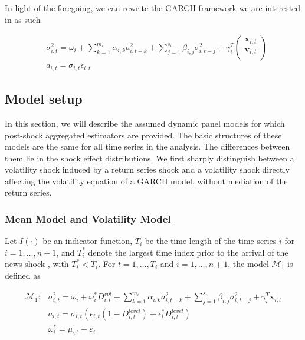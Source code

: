 \documentclass[11pt]{article}
\newcommand{\x}{\textbf{x}}
\def\mc#1{\mathcal{#1}} %
\def\mc#1{\mathcal{#1}}
\theoremstyle{definition}
\begin{document}
In light of the foregoing, we can rewrite the GARCH framework we are interested in as such

\begin{align*}
&\sigma_{i,t}^{2} = \omega_{i} + \sum^{m_{i}}_{k=1}\alpha_{i,k}a^{2}_{i,t-k} + \sum_{j=1}^{s_{i}}\beta_{i,j}\sigma_{i,t-j}^{2} + \gamma_{i}^{T} \begin{pmatrix} \x_{i,t} \\ \textbf{v}_{i,t} \\ \end{pmatrix} \\
&a_{i,t} = \sigma_{i,t}\epsilon_{i,t}
\end{align*}


\subsection{Model setup}
\label{modelsetup}
In this section, we will describe the assumed dynamic panel models for which 
post-shock aggregated estimators are provided. The basic structures of these models 
are the same for all time series in the analysis.  The differences between them lie in the shock effect distributions.  We first sharply distinguish between a volatility shock induced by a return series shock and a volatility shock directly affecting the volatility equation of a GARCH model, without mediation of the return series.

\subsubsection{Mean Model and Volatility Model}

Let $I(\cdot)$ be an indicator function, $T_i$ be the time length of the time series $i$ for $i = 1, \ldots, n+1$, and $T_i^*$ denote the largest time index prior to the arrival of the news shock , with $T_i^* < T_i$.  For $t= 1, \ldots, T_i$ and $i = 1, \ldots, n+1$, the model $\mc{M}_1$ is defined as

\begin{align}
\mc{M}_1 \colon &\sigma^{2}_{i,t} = \omega_{i} + \omega^{*}_i D^{vol}_{i,t} + \sum^{m_{i}}_{k=1}\alpha_{i,k}a^{2}_{i,t-k} + \sum_{j=1}^{s_{i}}\beta_{i,j}\sigma_{i,t-j}^{2} + \gamma_{i}^{T} \x_{i,t}\\
&a_{i,t} = \sigma_{i,t}(\epsilon_{i,t}(1-D^{level}_{i,t}) + \epsilon^{*}_{i}D^{level}_{i,t})\\ 
&\omega_i^{*} = \mu_{\omega^{*}} + \varepsilon_{i} \label{model1}
\end{align}
\end{document}

